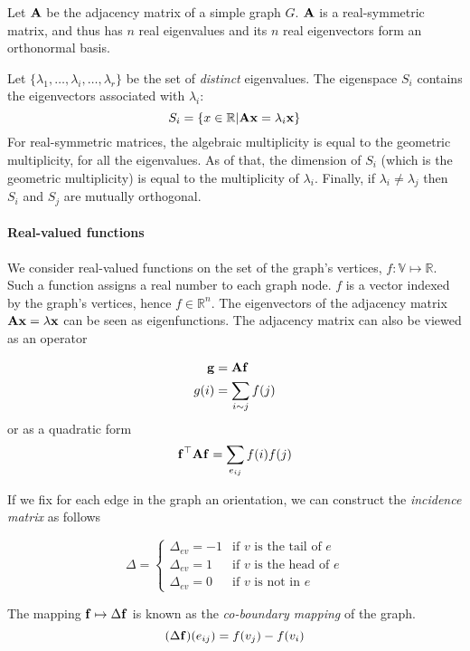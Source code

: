 
Let $\vb{A}$ be the adjacency matrix of a simple graph $G$. $\vb{A}$ is a real-symmetric matrix, and thus has $n$ real eigenvalues and its $n$ real eigenvectors form an orthonormal basis.

Let $\{ \lambda_1, \dots, \lambda_i, \dots, \lambda_r\}$ be the set of \emph{distinct} eigenvalues.
The eigenspace $S_i$ contains the eigenvectors associated with $\lambda_i$:
\[
	S_i = \{ x \in \mathbb{R} | \vb{Ax} = \lambda_i \vb{x}\}
\]
For real-symmetric matrices, the algebraic multiplicity is equal to the geometric multiplicity, for all the eigenvalues. As of that, the dimension of $S_i$ (which is the geometric multiplicity) is equal to the multiplicity of $\lambda_i$. Finally, if $\lambda_i \neq \lambda_j$ then $S_i$ and $S_j$ are mutually orthogonal.

\paragraph{Real-valued functions}

We consider real-valued functions on the set of the graph's vertices, $f: \mathbb{V} \mapsto \mathbb{R}$. Such a function assigns a real number to each graph node. $f$ is a vector indexed by the graph's vertices, hence $f \in \mathbb{R}^n$. The eigenvectors of the adjacency matrix $\vb{Ax} = \lambda \vb{x}$ can be seen as eigenfunctions.
The adjacency matrix can also be viewed as an operator

\begin{align}
	\vb{g} &= \vb{Af} \\
	g(i) &= \sum_{i \sim j} f(j)
\end{align}
or as a quadratic form 
\begin{equation}
	\vb{f}^\top\vb{Af} = \sum_{e_{ij}} f(i) f(j)
\end{equation}

If we fix for each edge in the graph an orientation, we can construct the \emph{incidence matrix} as follows 

	\[\Delta = 
	\begin{cases}
		\Delta_{ev} = -1 & \text{if $v$ is the tail of $e$} \\ 
		\Delta_{ev} = 1 & \text{if $v$ is the head of $e$} \\
		\Delta_{ev} = 0 & \text{if $v$ is not in $e$}
	\end{cases}
\]

The mapping $\vb{f} \mapsto \Delta \vb{f}$ is known as the \emph{co-boundary mapping} of the graph. 
\begin{equation}
	(\Delta \vb{f})(e_{ij}) = f(v_j) - f(v_i)
\end{equation}
